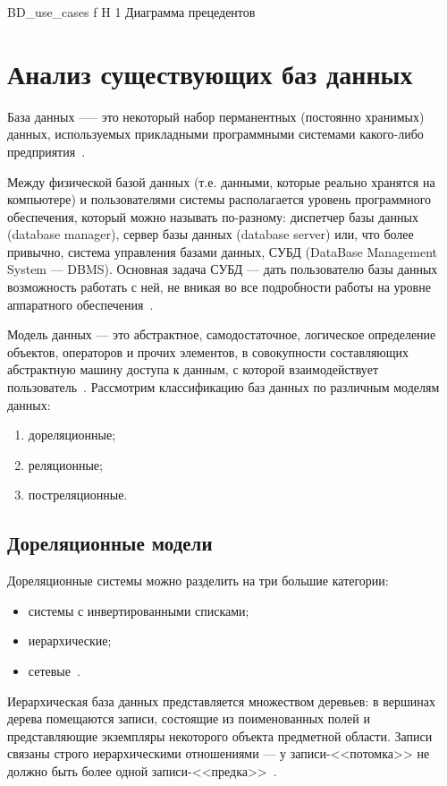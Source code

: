{BD_use_cases} %
{f} %
{H} %
{1\textwidth} %
{Диаграмма прецедентов} %


\section{Анализ существующих баз данных}
База данных —-- это некоторый набор перманентных (постоянно хранимых) данных, используемых прикладными программными системами какого-либо предприятия~\cite{williams-db}.

Между физической базой данных (т.е. данными, которые реально хранятся на компьютере) и пользователями системы располагается уровень программного
обеспечения, который можно называть по-разному: диспетчер базы данных (database 
manager), сервер базы данных (database server) или, что более привычно, система управления базами данных, СУБД (DataBase Management System — DBMS).
Основная задача СУБД --- дать пользователю базы данных возможность работать с ней, не вникая во все подробности работы на уровне аппаратного обеспечения~\cite{williams-db}.

Модель данных — это абстрактное, самодостаточное, логическое определение объектов, операторов и прочих элементов, в совокупности составляющих абстрактную машину доступа к данным, с которой взаимодействует пользователь~\cite{williams-db}.
Рассмотрим классификацию баз данных по различным моделям данных:
\begin{enumerate}
	\item дореляционные;
	\item реляционные;
	\item постреляционные.
\end{enumerate}

\subsection{Дореляционные модели}
Дореляционные системы можно разделить на три большие категории:
\begin{itemize}
	\item системы с инвертированными списками;
	\item иерархические;
	\item сетевые~\cite{williams-db}.
\end{itemize}
Иерархическая база данных представляется множеством 
деревьев: в вершинах дерева помещаются записи, состоящие из поименованных 
полей и представляющие экземпляры некоторого объекта предметной области. 
Записи связаны строго иерархическими отношениями --- у записи-<<потомка>> не 
должно быть более одной записи-<<предка>>~\cite{wolf-db}.

